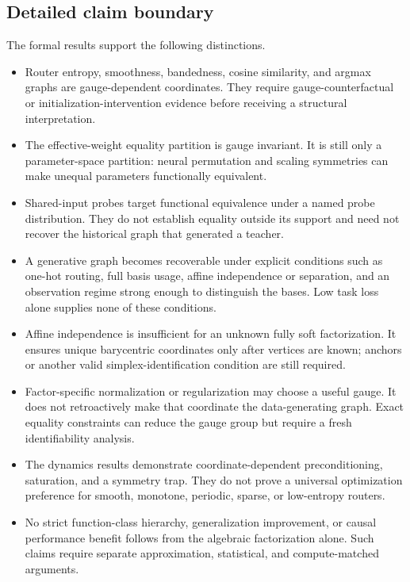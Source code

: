 \subsection{Detailed claim boundary}
\label{app:claim_boundary}

The formal results support the following distinctions.
\begin{itemize}
 \item Router entropy, smoothness, bandedness, cosine similarity, and argmax
 graphs are gauge-dependent coordinates.  They require gauge-counterfactual
 or initialization-intervention evidence before receiving a structural
 interpretation.

 \item The effective-weight equality partition is gauge invariant.  It is
 still only a parameter-space partition: neural permutation and scaling
 symmetries can make unequal parameters functionally equivalent.

 \item Shared-input probes target functional equivalence under a named probe
 distribution.  They do not establish equality outside its support and need
 not recover the historical graph that generated a teacher.

 \item A generative graph becomes recoverable under explicit conditions such
 as one-hot routing, full basis usage, affine independence or separation, and
 an observation regime strong enough to distinguish the bases.  Low task loss
 alone supplies none of these conditions.

 \item Affine independence is insufficient for an unknown fully soft
 factorization.  It ensures unique barycentric coordinates only after vertices
 are known; anchors or another valid simplex-identification condition are
 still required.

 \item Factor-specific normalization or regularization may choose a useful
 gauge.  It does not retroactively make that coordinate the data-generating
 graph.  Exact equality constraints can reduce the gauge group but require a
 fresh identifiability analysis.

 \item The dynamics results demonstrate coordinate-dependent preconditioning,
 saturation, and a symmetry trap.  They do not prove a universal optimization
 preference for smooth, monotone, periodic, sparse, or low-entropy routers.

 \item No strict function-class hierarchy, generalization improvement, or
 causal performance benefit follows from the algebraic factorization alone.
 Such claims require separate approximation, statistical, and compute-matched
 arguments.
\end{itemize}
